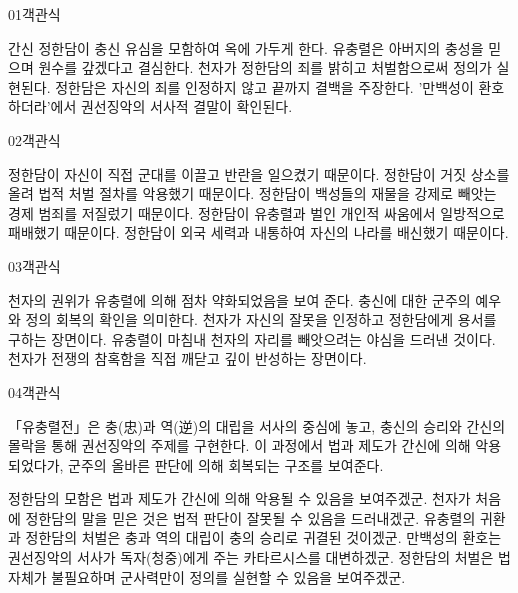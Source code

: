 \documentclass[fs85,seriesWit]{korfarm-base}
\begin{document}
\kfBeginMC
\begin{kfQBlock}{01}{객관식}
\begin{kfChoices}
\kfChoice 간신 정한담이 충신 유심을 모함하여 옥에 가두게 한다.
\kfChoice 유충렬은 아버지의 충성을 믿으며 원수를 갚겠다고 결심한다.
\kfChoice 천자가 정한담의 죄를 밝히고 처벌함으로써 정의가 실현된다.
\kfChoice 정한담은 자신의 죄를 인정하지 않고 끝까지 결백을 주장한다.
\kfChoice '만백성이 환호하더라'에서 권선징악의 서사적 결말이 확인된다.
\end{kfChoices}
\end{kfQBlock}

\begin{kfQBlock}{02}{객관식}
\begin{kfChoices}
\kfChoice 정한담이 자신이 직접 군대를 이끌고 반란을 일으켰기 때문이다.
\kfChoice 정한담이 거짓 상소를 올려 법적 처벌 절차를 악용했기 때문이다.
\kfChoice 정한담이 백성들의 재물을 강제로 빼앗는 경제 범죄를 저질렀기 때문이다.
\kfChoice 정한담이 유충렬과 벌인 개인적 싸움에서 일방적으로 패배했기 때문이다.
\kfChoice 정한담이 외국 세력과 내통하여 자신의 나라를 배신했기 때문이다.
\end{kfChoices}
\end{kfQBlock}

\begin{kfQBlock}{03}{객관식}
\begin{kfChoices}
\kfChoice 천자의 권위가 유충렬에 의해 점차 약화되었음을 보여 준다.
\kfChoice 충신에 대한 군주의 예우와 정의 회복의 확인을 의미한다.
\kfChoice 천자가 자신의 잘못을 인정하고 정한담에게 용서를 구하는 장면이다.
\kfChoice 유충렬이 마침내 천자의 자리를 빼앗으려는 야심을 드러낸 것이다.
\kfChoice 천자가 전쟁의 참혹함을 직접 깨닫고 깊이 반성하는 장면이다.
\end{kfChoices}
\end{kfQBlock}

\begin{kfQBlock}{04}{객관식}
\begin{kfEvidence}「유충렬전」은 충(忠)과 역(逆)의 대립을 서사의 중심에 놓고, 충신의 승리와 간신의 몰락을 통해 권선징악의 주제를 구현한다. 이 과정에서 법과 제도가 간신에 의해 악용되었다가, 군주의 올바른 판단에 의해 회복되는 구조를 보여준다.\end{kfEvidence}
\begin{kfChoices}
\kfChoice 정한담의 모함은 법과 제도가 간신에 의해 악용될 수 있음을 보여주겠군.
\kfChoice 천자가 처음에 정한담의 말을 믿은 것은 법적 판단이 잘못될 수 있음을 드러내겠군.
\kfChoice 유충렬의 귀환과 정한담의 처벌은 충과 역의 대립이 충의 승리로 귀결된 것이겠군.
\kfChoice 만백성의 환호는 권선징악의 서사가 독자(청중)에게 주는 카타르시스를 대변하겠군.
\kfChoice 정한담의 처벌은 법 자체가 불필요하며 군사력만이 정의를 실현할 수 있음을 보여주겠군.
\end{kfChoices}
\end{kfQBlock}
\end{document}
